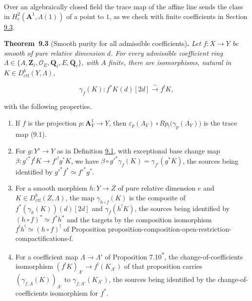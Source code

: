 \documentclass[11pt]{article}
\newenvironment{bpstatement}[2]{\par\addvspace{0.6\baselineskip}\noindent\textbf{#1}#2\textbf{.}\enspace\ignorespaces}
  {\par\addvspace{0.4\baselineskip}}
\newenvironment{bpstatementit}[2]{\begin{bpstatement}{#1}{#2}\itshape\ignorespaces}{\end{bpstatement}}
\newcommand{\bpout}[1]{#1\textsuperscript{\hyperlink{bp-outside}{\ensuremath{\ast}}}}
\begin{document}
\label{bp10}%
Over an algebraically closed field the trace map of the affine line sends the class in \(H^2_c(\mathbf A^1,\Lambda(1))\) of a point to \(1\), as we check with finite coefficients in Section \hyperref[bp17]{9.3}.

\label{bp11}%
\begin{bpstatementit}{Theorem~9.3}{ (Smooth purity for all admissible coefficients)}
Let \(f:X\to Y\) be smooth of pure relative dimension \(d\). For every admissible coefficient ring \(\Lambda\in\{A,\mathbf Z_\ell,\mathcal O_E,\mathbf Q_\ell,E,\overline{\mathbf Q}_\ell\}\), with \(A\) finite, there are isomorphisms, natural in \(K\in D^b_{\mathrm{ctf}}(Y,\Lambda)\),

\[
\gamma_f(K):
f^{*}K(d)[2d]\xrightarrow{\sim}f^{!}K,
\tag{9.2}
\]

with the following properties.

\begin{enumerate}
\item If \(f\) is the projection \(p:\mathbf A^1_Y\to Y\), then \(\varepsilon_p(\Lambda_Y)\circ Rp_!\bigl(\gamma_p(\Lambda_Y)\bigr)\) is the trace map (9.1).
\item For \(g:Y'\to Y\) as in Definition \hyperref[bp7]{9.1}, with exceptional base change map \(\beta:g'^*f^!K\to f'^!g^*K\), we have \(\beta\circ g'^*\gamma_f(K)=\gamma_{f'}(g^*K)\), the sources being identified by \(g'^*f^*\simeq f'^*g^*\).
\item For a smooth morphism \(h:Y\to Z\) of pure relative dimension \(e\) and \(K\in D^b_{\mathrm{ctf}}(Z,\Lambda)\), the map \(\gamma_{h\circ f}(K)\) is the composite of \(f^*(\gamma_h(K))(d)[2d]\) and \(\gamma_f(h^!K)\), the sources being identified by \((h\circ f)^*\simeq f^*h^*\) and the targets by the composition isomorphism \(f^!h^!\simeq(h\circ f)^!\) of Proposition proposition-composition-open-restriction-compactifications-f.
\item For a coefficient map \(\Lambda\to\Lambda'\) of Proposition \bpout{7.10}, the change-of-coefficients isomorphism \((f^!K)_{\Lambda'}\to f^!(K_{\Lambda'})\) of that proposition carries \((\gamma_{f,\Lambda}(K))_{\Lambda'}\) to \(\gamma_{f,\Lambda'}(K_{\Lambda'})\), the sources being identified by the change-of-coefficients isomorphism for \(f^*\).
\end{enumerate}
\end{bpstatementit}
\end{document}
